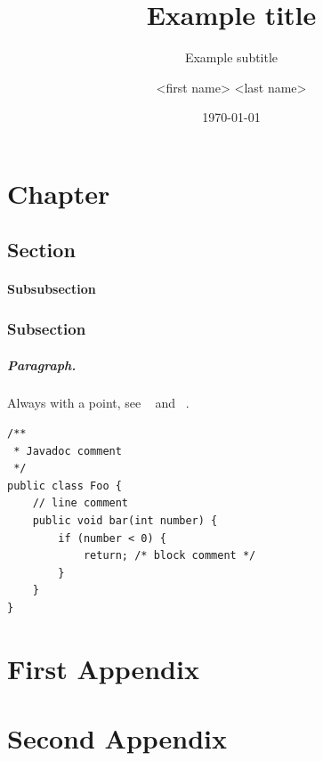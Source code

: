 \documentclass{hasel_thesis}
\date{\today}
\title{Example title}
\subtitle{Example subtitle}
\author{<first name> <last name>}
\begin{document}
\maketitle

\frontmatter

\begin{acknowledgements}
\end{acknowledgements}

\begin{abstract}
\end{abstract}

\begin{zusammenfassung}
\end{zusammenfassung}

\tableofcontents
\listoffigures
\listoftables
\lstlistoflistings

\mainmatter
\chapter{Chapter}
\section{Section}
%
\subsubsection{Subsubsection}

\subsection{Subsection}
%
\paragraph{Paragraph.} Always with a point, see \citeauthor{texbook}~\cite{texbook} and \citeauthor{latex:companion}~\cite{latex:companion}.

\begin{lstlisting}[caption=An example code snippet]
/**
 * Javadoc comment
 */
public class Foo {
	// line comment
	public void bar(int number) {
		if (number < 0) {
			return; /* block comment */
		}
	}
}
\end{lstlisting}

\printbibliography


\appendix
\chapter{First Appendix}
\chapter{Second Appendix}

\backmatter
\end{document}
